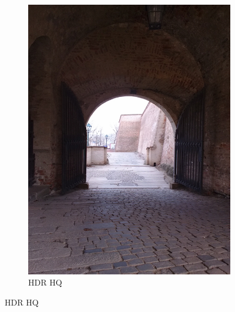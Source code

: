 \begin{figure}[h!]
\begin{subfigure}{0.3\textwidth}
        \includegraphics[width=\textwidth]{figures/tests/hdrApps/hdrHq}
        \caption{HDR HQ}
        \label{fig:apps_2}
    \end{subfigure}
    

\end{figure}

